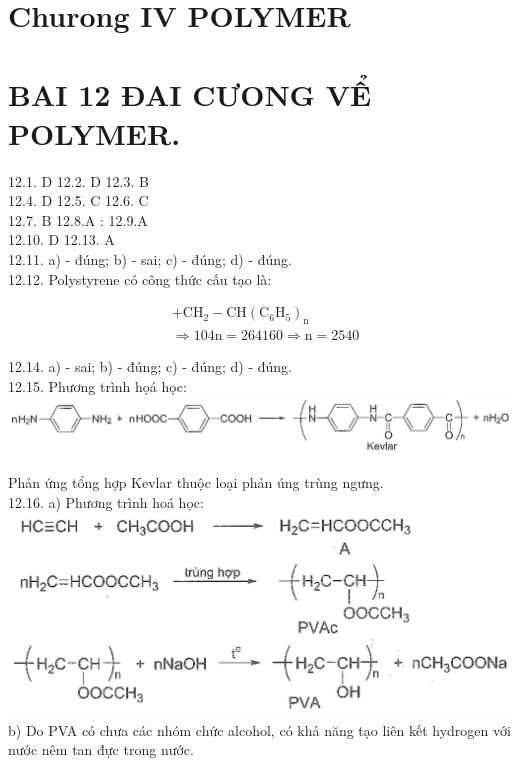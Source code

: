 \documentclass[10pt]{article}
\begin{document}
\section*{Churong IV POLYMER}
\section*{BAI 12 ĐAI CƯONG VỂ POLYMER.}
12.1. D 12.2. D 12.3. B\\
12.4. D 12.5. C 12.6. C\\
12.7. B 12.8.A : 12.9.A\\
12.10. D 12.13. A\\
12.11. a) - đúng; b) - sai; c) - đúng; d) - đúng.\\
12.12. Polystyrene có công thức cấu tạo là:

$$
\begin{aligned}
&+\mathrm{CH}_{2}-\mathrm{CH}\left(\mathrm{C}_{6} \mathrm{H}_{5}\right)_{\mathrm{n}} \\
& \Rightarrow 104 \mathrm{n}=264160 \Rightarrow \mathrm{n}=2540
\end{aligned}
$$

12.14. a) - sai; b) - đúng; c) - đúng; d) - đúng.\\
12.15. Phương trình họá học:\\
\includegraphics[max width=\textwidth, center]{2025_10_23_b82d44049ffb48e891e8g-15}

Phản ứng tổng hợp Kevlar thuộc loại phản úng trùng ngưng.\\
12.16. a) Phương trình hoá học:\\
\includegraphics[max width=\textwidth, center]{2025_10_23_b82d44049ffb48e891e8g-15(1)}\\
b) Do PVA có chưa các nhóm chức alcohol, có khả năng tạo liên kết hydrogen với nước nêm tan đực trong nước.
\end{document}
